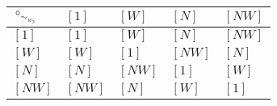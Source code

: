 \begin{tabularx}{0.6\textwidth}{l|llll}
$\circ_{\sim_{w_{3}}}$ & $[1]$ & $[W]$ & $[N]$ & $[NW]$ \\
\hline
$[1]$ & $[1]$ & $[W]$ & $[N]$ & $[NW]$ \\
$[W]$ & $[W]$ & $[1]$ & $[NW]$ & $[N]$ \\
$[N]$ & $[N]$ & $[NW]$ & $[1]$ & $[W]$ \\
$[NW]$ & $[NW]$ & $[N]$ & $[W]$ & $[1]$ \\
\end{tabularx}
